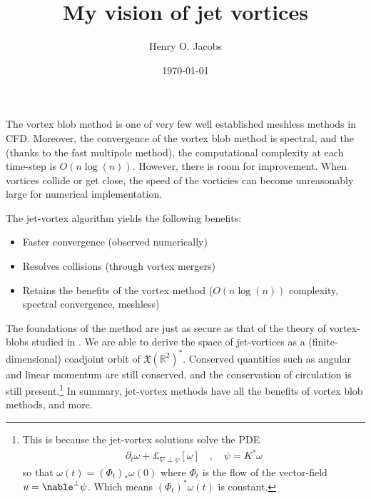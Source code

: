 \documentclass[12pt]{amsart}
\title{My vision of jet vortices}
\author{Henry O. Jacobs}
\date{\today}
\begin{document}
\maketitle

The vortex blob method is one of very few well established meshless methods in CFD.
Moreover, the convergence of the vortex blob method is spectral, and the (thanks to the fast multipole method), the computational complexity 
at each time-step is $O(n \log(n))$.
However, there is room for improvement.
When vortices collide or get close, the speed of the vorticies can become unreasonably large for numerical implementation.

The jet-vortex algorithm yields the following benefits:
\begin{itemize}
  \item Faster convergence (observed numerically)
  \item Resolves collisions (through vortex mergers)
  \item Retains the benefits of the vortex method ($O(n \log(n))$ complexity, spectral convergence, meshless)
\end{itemize}

The foundations of the method are just as secure as that of the theory of vortex-blobs studied in \cite{MarsdenWeinstein1983,GayBalmazVizman2012}.  We are able to derive the space of jet-vortices as a (finite-dimensional) coadjoint orbit of $\mathfrak{X}(\mathbb{R}^2)^*$.
Conserved quantities such as angular and linear momentum are still conserved,
and the conservation of circulation is still present.\footnote{This is because the jet-vortex solutions solve the PDE
\begin{align*}
  \partial_t \omega + \pounds_{\nabla \perp \psi}[\omega]
  \quad,\quad \psi = K^* \omega
\end{align*}
so that $\omega(t) = (\Phi_t)_*\omega(0)$ where $\Phi_t$ is the flow of the vector-field $u = \nable^\perp \psi$.
Which means $(\Phi_t)^* \omega(t)$ is constant.
}
In summary, jet-vortex methods have all the benefits of vortex blob methods,
and more.



\end{document}
